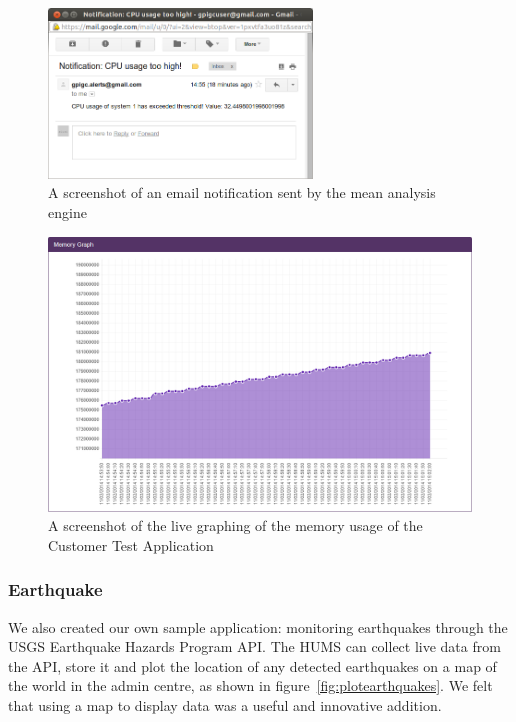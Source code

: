 \documentclass[10pt,a4paper]{article}
\begin{document}
\begin{figure}[htbp!]
  \centering
  \includegraphics[width=7cm]{images/TestApplicationCPUAlert.png}
  \caption{A screenshot of an email notification sent by the mean analysis engine}
  \label{fig:alerting}
\end{figure}


\begin{figure}[htbp!]
  \centering
  \includegraphics[width=12cm]{images/TestApplicationMemoryGraph.png}
  \caption{A screenshot of the live graphing of the memory usage of the Customer 
  Test Application}
  \label{fig:graphing}
\end{figure}

\subsubsection{Earthquake}
We also created our own sample application: monitoring earthquakes 
through the USGS Earthquake Hazards Program API. The HUMS
can collect live data from the API, store it and plot the location of any
detected earthquakes on a map of the world in the admin centre, as shown
in figure~\ref{fig:plotearthquakes}. We felt that using a map to display
data was a useful and innovative addition.
\end{document}
